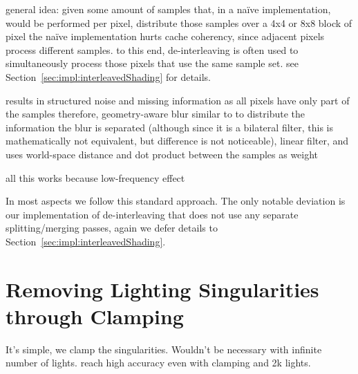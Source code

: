 \begin{outline}
\1 general idea: given some amount of samples that, in a naïve implementation, would be performed per pixel, distribute those samples over a 4x4 or 8x8 block of pixel
\1 the naïve implementation hurts cache coherency, since adjacent pixels process different samples.
\1 to this end, de-interleaving \citep{segovia2006non} is often used to simultaneously process those pixels that use the same sample set. see Section~\ref{sec:impl:interleavedShading} for details.

\1 results in structured noise and missing information as all pixels have only part of the samples
\1 therefore, geometry-aware blur similar to \citet{laine2007incremental} to distribute the information
\1 the blur is separated (although since it is a bilateral filter, this is mathematically not equivalent, but difference is not noticeable), linear filter, and uses world-space distance and dot product between the samples as weight

\1 all this works because low-frequency effect

\1 In most aspects we follow this standard approach. The only notable deviation is our implementation of de-interleaving that does not use any separate splitting/merging passes, again we defer details to Section~\ref{sec:impl:interleavedShading}.

\end{outline}



\section{Removing Lighting Singularities through Clamping}
\label{sec:concept:clamping}
It's simple, we clamp the singularities. Wouldn't be necessary with infinite number of lights. \citet{hedman2016sequential} reach high accuracy even with clamping and 2k lights.


